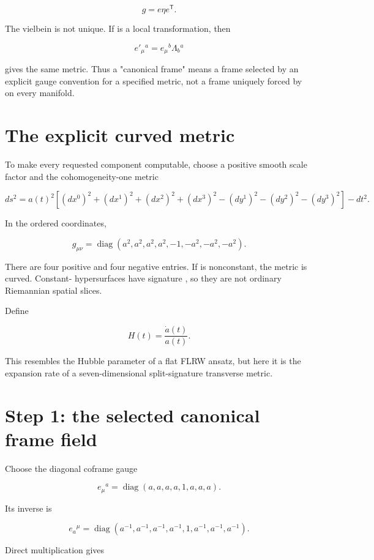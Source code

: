 \documentclass[11pt]{article}
\begin{document}
\[
g=e\eta e^{\mathsf T}.
\]

The vielbein is not unique. If \texttt{} is a local \texttt{} transformation, then

\[
e'_\mu{}^a=e_\mu{}^b\Lambda_b{}^a
\]

gives the same metric. Thus a "canonical frame" means a frame selected by an explicit gauge convention for a specified metric, not a frame uniquely forced by \texttt{} on every manifold.

\section{The explicit curved \texttt{} metric}

To make every requested component computable, choose a positive smooth scale factor \texttt{} and the cohomogeneity-one metric

\[
\boxed{
 ds^2=a(t)^2\left[(dx^0)^2+(dx^1)^2+(dx^2)^2+(dx^3)^2
 -(dy^1)^2-(dy^2)^2-(dy^3)^2\right]-dt^2.}
\]

In the ordered coordinates,

\[
g_{\mu\nu}=\operatorname{diag}
\left(a^2,a^2,a^2,a^2,-1,-a^2,-a^2,-a^2\right).
\]

There are four positive and four negative entries. If \texttt{} is nonconstant, the metric is curved. Constant-\texttt{} hypersurfaces have signature \texttt{}, so they are not ordinary Riemannian spatial slices.

Define

\[
H(t)=\frac{\dot a(t)}{a(t)}.
\]

This resembles the Hubble parameter of a flat FLRW ansatz, but here it is the expansion rate of a seven-dimensional split-signature transverse metric.

\section{Step 1: the selected canonical frame field}

Choose the diagonal coframe gauge

\[
e_\mu{}^a=
\operatorname{diag}(a,a,a,a,1,a,a,a).
\]

Its inverse is

\[
e_a{}^\mu=
\operatorname{diag}(a^{-1},a^{-1},a^{-1},a^{-1},1,
 a^{-1},a^{-1},a^{-1}).
\]

Direct multiplication gives
\end{document}
